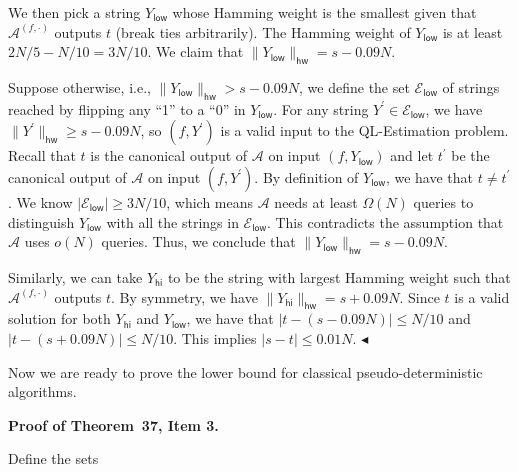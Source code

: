 We then pick a string $Y_{\mathsf{low}}$ whose Hamming weight is the smallest given that $\mathcal{A}^{(f,\cdot)}$ outputs $t$ (break ties arbitrarily). The Hamming weight of $Y_{\mathsf{low}}$ is at least $2N/5-N/10=3N/10$. We claim that $\|Y_{\mathsf{low}}\|_{\mathsf{hw}}=s-0.09N$.\par




Suppose otherwise, i.e., $\|Y_{\mathsf{low}}\|_{\mathsf{hw}}>s-0.09N$, we define the set $\mathcal{E}_{\mathsf{low}}$ of strings reached by flipping any “1” to a “0” in $Y_{\mathsf{low}}$. For any string $Y^{\prime}\in\mathcal{E}_{\mathsf{low}}$, we have $\|Y^{\prime}\|_{\mathsf{hw}}\geq s-0.09N$, so $(f,Y^{\prime})$ is a valid input to the QL-Estimation problem.
Recall that $t$ is the canonical output of $\mathcal{A}$ on input $(f,Y_{\mathsf{low}})$ and let $t^{\prime}$ be the canonical output of $\mathcal{A}$ on input $(f,Y^{\prime})$. By definition of $Y_{\mathsf{low}}$, we have that $t\neq t^{\prime}$. We know $|\mathcal{E}_{\mathsf{low}}|\geq 3N/10$, which means $\mathcal{A}$ needs at least $\Omega(N)$ queries to distinguish $Y_{\mathsf{low}}$ with all the strings in $\mathcal{E}_{\mathsf{low}}$. This contradicts the assumption that $\mathcal{A}$ uses $o(N)$ queries. Thus, we conclude that $\|Y_{\mathsf{low}}\|_{\mathsf{hw}}=s-0.09N$.\par




Similarly, we can take $Y_{\mathsf{hi}}$ to be the string with largest Hamming weight such that $\mathcal{A}^{(f,\cdot)}$ outputs $t$. By symmetry, we have $\|Y_{\mathsf{hi}}\|_{\mathsf{hw}}=s+0.09N$. Since $t$ is a valid solution for both $Y_{\mathsf{hi}}$ and $Y_{\mathsf{low}}$, we have that $|t-(s-0.09N)|\leq N/10$ and $|t-(s+0.09N)|\leq N/10$. This implies $|s-t|\leq 0.01N$.
$\blacktriangleleft$\par




Now we are ready to prove the lower bound for classical pseudo-deterministic algorithms.\par





\par\medskip\noindent\textbf{Proof of Theorem 37, Item 3.}\par




Define the sets\par


